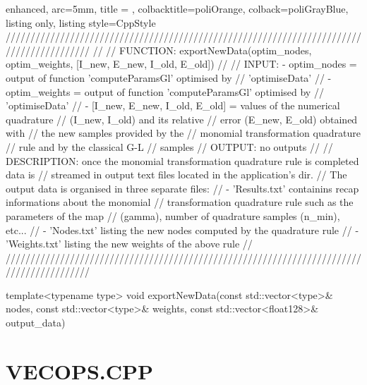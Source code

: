 \documentclass[a4paper, twosided]{book}
\begin{document}
\begin{tcblisting}{enhanced,
                   arc=5mm,
                   title = \color{black}{\large \ttfamily DatIo.cpp/exportNewData},
                   colbacktitle=poliOrange,
                   colback=poliGrayBlue,
                   listing only,
                   listing style=CppStyle}
/////////////////////////////////////////////////////////////////////////////////////////
//
//       FUNCTION: exportNewData(optim_nodes, optim_weights, [I_new, E_new, I_old, E_old])
//                
//          INPUT: - optim_nodes = output of function 'computeParamsGl' optimised by
//                                 'optimiseData'
//                 - optim_weights = output of function 'computeParamsGl' optimised by
//                                 'optimiseData'
//                 - [I_new, E_new, I_old, E_old] = values of the numerical quadrature
//                                                  (I_new, I_old) and its relative
//                                                  error (E_new, E_old) obtained with
//                                                  the new samples provided by the 
//                                                  monomial transformation quadrature 
//                                                  rule and by the classical G-L 
//                                                  samples
//         OUTPUT: no outputs
//
//    DESCRIPTION: once the monomial transformation quadrature rule is completed data is
//                 streamed in output text files located in the application's dir.
//                 The output data is organised in three separate files:
//                    - 'Results.txt' containins recap informations about the monomial
//                      transformation quadrature rule such as the parameters of the map
//                      (gamma), number of quadrature samples (n_min), etc...
//                    - 'Nodes.txt' listing the new nodes computed by the quadrature rule
//                    - 'Weights.txt' listing the new weights of the above rule
//
/////////////////////////////////////////////////////////////////////////////////////////

template<typename type>
void exportNewData(const std::vector<type>& nodes, const std::vector<type>& weights, const std::vector<float128>& output_data)
\end{tcblisting}

\newpage

\section[VecOps.cpp]{\changefont VECOPS.CPP}\label{Sec4.3}
\end{document}
